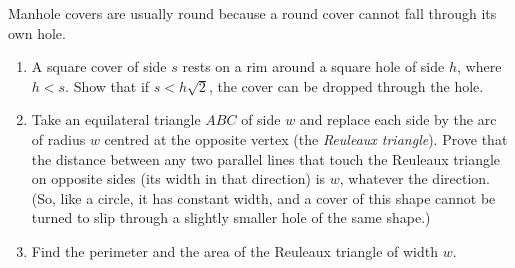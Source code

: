 Manhole covers are usually round because a round cover cannot fall through its own hole.
\begin{enumerate}
\item[(a)] A square cover of side $s$ rests on a rim around a square hole of side $h$, where $h<s$. Show that if $s<h\sqrt2$, the cover can be dropped through the hole.
\item[(b)] Take an equilateral triangle $ABC$ of side $w$ and replace each side by the arc of radius $w$ centred at the opposite vertex (the \emph{Reuleaux triangle}). Prove that the distance between any two parallel lines that touch the Reuleaux triangle on opposite sides (its width in that direction) is $w$, whatever the direction. (So, like a circle, it has constant width, and a cover of this shape cannot be turned to slip through a slightly smaller hole of the same shape.)
\item[(c)] Find the perimeter and the area of the Reuleaux triangle of width $w$.
\end{enumerate}
